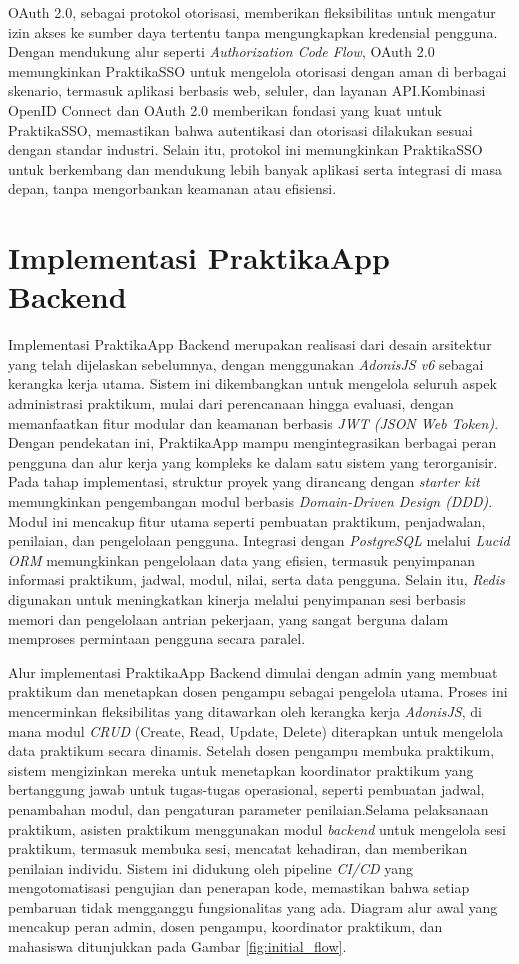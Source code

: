 OAuth 2.0, sebagai protokol otorisasi, memberikan fleksibilitas untuk mengatur izin akses ke sumber daya tertentu tanpa mengungkapkan kredensial pengguna. Dengan mendukung alur seperti \emph{Authorization Code Flow}, OAuth 2.0 memungkinkan PraktikaSSO untuk mengelola otorisasi dengan aman di berbagai skenario, termasuk aplikasi berbasis web, seluler, dan layanan API.Kombinasi OpenID Connect dan OAuth 2.0 memberikan fondasi yang kuat untuk PraktikaSSO, memastikan bahwa autentikasi dan otorisasi dilakukan sesuai dengan standar industri. Selain itu, protokol ini memungkinkan PraktikaSSO untuk berkembang dan mendukung lebih banyak aplikasi serta integrasi di masa depan, tanpa mengorbankan keamanan atau efisiensi.


\section{Implementasi PraktikaApp Backend}
Implementasi PraktikaApp Backend merupakan realisasi dari desain arsitektur yang telah dijelaskan sebelumnya, dengan menggunakan \emph{AdonisJS v6} sebagai kerangka kerja utama. Sistem ini dikembangkan untuk mengelola seluruh aspek administrasi praktikum, mulai dari perencanaan hingga evaluasi, dengan memanfaatkan fitur modular dan keamanan berbasis \emph{JWT (JSON Web Token)}. Dengan pendekatan ini, PraktikaApp mampu mengintegrasikan berbagai peran pengguna dan alur kerja yang kompleks ke dalam satu sistem yang terorganisir. Pada tahap implementasi, struktur proyek yang dirancang dengan \emph{starter kit} memungkinkan pengembangan modul berbasis \emph{Domain-Driven Design (DDD)}. Modul ini mencakup fitur utama seperti pembuatan praktikum, penjadwalan, penilaian, dan pengelolaan pengguna. Integrasi dengan \emph{PostgreSQL} melalui \emph{Lucid ORM} memungkinkan pengelolaan data yang efisien, termasuk penyimpanan informasi praktikum, jadwal, modul, nilai, serta data pengguna. Selain itu, \emph{Redis} digunakan untuk meningkatkan kinerja melalui penyimpanan sesi berbasis memori dan pengelolaan antrian pekerjaan, yang sangat berguna dalam memproses permintaan pengguna secara paralel.

Alur implementasi PraktikaApp Backend dimulai dengan admin yang membuat praktikum dan menetapkan dosen pengampu sebagai pengelola utama. Proses ini mencerminkan fleksibilitas yang ditawarkan oleh kerangka kerja \emph{AdonisJS}, di mana modul \emph{CRUD} (Create, Read, Update, Delete) diterapkan untuk mengelola data praktikum secara dinamis. Setelah dosen pengampu membuka praktikum, sistem mengizinkan mereka untuk menetapkan koordinator praktikum yang bertanggung jawab untuk tugas-tugas operasional, seperti pembuatan jadwal, penambahan modul, dan pengaturan parameter penilaian.Selama pelaksanaan praktikum, asisten praktikum menggunakan modul \emph{backend} untuk mengelola sesi praktikum, termasuk membuka sesi, mencatat kehadiran, dan memberikan penilaian individu. Sistem ini didukung oleh pipeline \emph{CI/CD} yang mengotomatisasi pengujian dan penerapan kode, memastikan bahwa setiap pembaruan tidak mengganggu fungsionalitas yang ada. Diagram alur awal yang mencakup peran admin, dosen pengampu, koordinator praktikum, dan mahasiswa ditunjukkan pada Gambar \ref{fig:initial_flow}.

